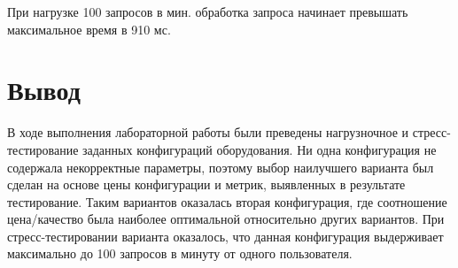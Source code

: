 \documentclass[a4paper,10pt]{article}
\begin{document}
		При нагрузке 100 запросов в мин. обработка запроса начинает превышать максимальное время в 910 мс.

\section*{Вывод}

	В ходе выполнения лабораторной работы были преведены нагрузночное и стресс- тестирование заданных конфигураций
	оборудования. Ни одна конфигурация не содержала некорректные параметры, поэтому выбор наилучшего варианта
	был сделан на основе цены конфигурации и метрик, выявленных в результате тестирование. Таким вариантов оказалась
	вторая конфигурация, где соотношение цена/качество была наиболее оптимальной относительно других вариантов. 
	При стресс-тестировании варианта оказалось, что данная конфигурация выдерживает максимально до 100 запросов в минуту
	от одного пользователя.
\end{document}
